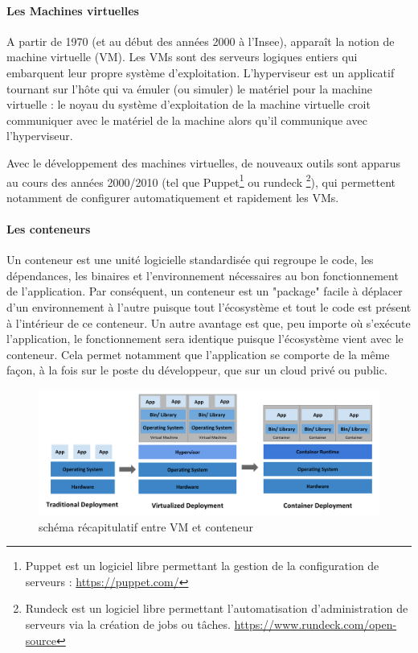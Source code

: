 \documentclass[11pt,fleqn]{book} %
\begin{document}
\paragraph{Les Machines virtuelles}
A partir de 1970 (et au début des années 2000 à l'Insee), apparaît  la notion de machine virtuelle (VM). Les VMs sont des serveurs logiques entiers qui embarquent leur propre système d’exploitation. L’hyperviseur est un applicatif tournant sur l’hôte qui va émuler (ou simuler) le matériel pour la machine virtuelle : le noyau du système d’exploitation de la machine virtuelle croit communiquer avec le matériel de la machine alors qu’il communique avec l’hyperviseur.

Avec le développement des machines virtuelles, de nouveaux outils sont apparus au cours des années 2000/2010 (tel que Puppet\footnote{Puppet est un logiciel libre permettant la gestion de la configuration de serveurs : \url{https://puppet.com/}} ou rundeck \footnote{Rundeck est un logiciel libre permettant l'automatisation d'administration de serveurs via la création de jobs ou tâches. \url{https://www.rundeck.com/open-source}}), qui permettent notamment de configurer automatiquement et rapidement les VMs.


\paragraph{Les conteneurs}
Un conteneur est une unité logicielle standardisée qui regroupe le code, les dépendances, les binaires et l'environnement nécessaires au bon fonctionnement de l'application. Par conséquent, un conteneur est un "package" facile à déplacer d'un environnement à l'autre puisque tout l'écosystème et tout le code est présent à l'intérieur de ce conteneur. Un autre avantage est que, peu importe où s'exécute l'application, le fonctionnement sera identique puisque l'écosystème vient avec le conteneur. Cela permet notamment que l'application se comporte de la même façon, à la fois sur le poste du développeur, que sur un cloud privé ou public. \\




\begin{figure}[H]\centering
\renewcommand{\figurename}{Graphique}
\includegraphics[scale=0.3]{Pictures/container_evolution.png}
\captionsetup{margin=1.5cm,format=hang,justification=justified}
\caption[]{schéma récapitulatif entre VM et conteneur \newline}
\end{figure}
\end{document}
